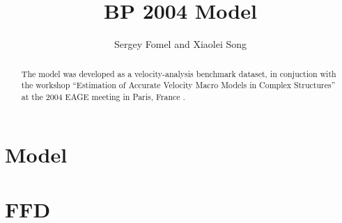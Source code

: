 \author{Sergey Fomel and Xiaolei Song}
\title{BP 2004 Model}

\maketitle

\begin{abstract}
The model was developed as a velocity-analysis benchmark dataset, in conjuction with the workshop ``Estimation of Accurate Velocity Macro Models in Complex Structures'' at the 2004 EAGE meeting in Paris, France \cite[]{bp2004}.
\end{abstract}

\section{Model}

 \clearpage
{} \clearpage
{} \clearpage

\section{FFD}

 \clearpage



